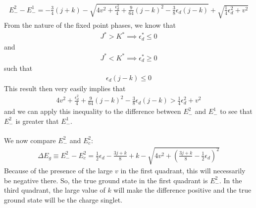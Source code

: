 \documentclass[twoside]{report}
\numberwithin{equation}{section}
\begin{document}
\begin{equation}\begin{aligned}
	E_-^2 - E_-^1= - \frac{3}{4}\left( j + k \right) - \sqrt{4v^2 + \frac{\epsilon_d^2}{4} + \frac{9}{64}\left( j - k \right) ^2 - \frac{3}{8}\epsilon_d\left( j-k \right) } + \sqrt{ \frac{1}{4}\epsilon_d^2 + v^2}
\end{aligned}\end{equation}
From the nature of the fixed point phases, we know that 
\begin{equation}\begin{aligned}
	J^* > K^* \implies \epsilon_d^* \leq 0
\end{aligned}\end{equation}
and
\begin{equation}\begin{aligned}
	J^* < K^* \implies \epsilon_d^* \geq 0
\end{aligned}\end{equation}
such that
\begin{equation}\begin{aligned}
	\epsilon_d\left( j-k \right) \leq 0
\end{aligned}\end{equation}
This result then very easily implies that
\begin{equation}\begin{aligned}
	4v^2 + \frac{\epsilon_d^2}{4} + \frac{9}{64}\left( j - k \right) ^2 - \frac{3}{8}\epsilon_d\left( j-k \right) > \frac{1}{4}\epsilon_d^2 + v^2
\end{aligned}\end{equation}
and we can apply this inequality to the difference between \(E_-^2\) and \(E_-^1\) to see that \(E_-^2\) is greater that \(E_-^1\).
\\\\We now compare \(E_-^2\) and \(E_c^2\):
\begin{equation}\begin{aligned}
	\Delta E_g \equiv E_-^2 - E_c^2 = \frac{1}{2}\epsilon_d - \frac{3j + k}{8} + k - \sqrt{4v^2 + \left(\frac{3j+k}{8} -\frac{1}{2} \epsilon_d\right) ^2}
\end{aligned}\end{equation}
Because of the presence of the large \(v\) in the first quadrant, this will necessarily be negative there. So, the true ground state in the first quadrant is \(E_-^2\). In the third quadrant, the large value of \(k\) will make the difference positive and the true ground state will be the charge singlet. 
\end{document}
